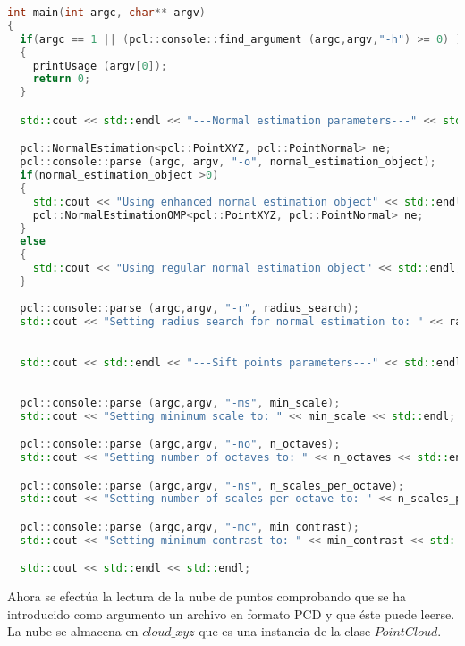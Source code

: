 \begin{lstlisting}[language=C++,breaklines]
int main(int argc, char** argv)
{
  if(argc == 1 || (pcl::console::find_argument (argc,argv,"-h") >= 0) )
  {
	printUsage (argv[0]);
	return 0;
  }	

  std::cout << std::endl << "---Normal estimation parameters---" << std::endl;

  pcl::NormalEstimation<pcl::PointXYZ, pcl::PointNormal> ne;
  pcl::console::parse (argc, argv, "-o", normal_estimation_object);
  if(normal_estimation_object >0)
  {
	std::cout << "Using enhanced normal estimation object" << std::endl;
	pcl::NormalEstimationOMP<pcl::PointXYZ, pcl::PointNormal> ne;
  }
  else
  {
	std::cout << "Using regular normal estimation object" << std::endl;
  }
  
  pcl::console::parse (argc,argv, "-r", radius_search);
  std::cout << "Setting radius search for normal estimation to: " << radius_search << std::endl;

  
  std::cout << std::endl << "---Sift points parameters---" << std::endl;
  
  
  pcl::console::parse (argc,argv, "-ms", min_scale);
  std::cout << "Setting minimum scale to: " << min_scale << std::endl;

  pcl::console::parse (argc,argv, "-no", n_octaves);
  std::cout << "Setting number of octaves to: " << n_octaves << std::endl;

  pcl::console::parse (argc,argv, "-ns", n_scales_per_octave);
  std::cout << "Setting number of scales per octave to: " << n_scales_per_octave << std::endl;

  pcl::console::parse (argc,argv, "-mc", min_contrast);
  std::cout << "Setting minimum contrast to: " << min_contrast << std::endl;

  std::cout << std::endl << std::endl;
\end{lstlisting}

Ahora se efectúa la lectura de la nube de puntos comprobando que se ha introducido como argumento un archivo en formato PCD y que éste puede leerse. La nube se almacena en $cloud\_xyz$ que es una instancia de la clase $PointCloud$.

